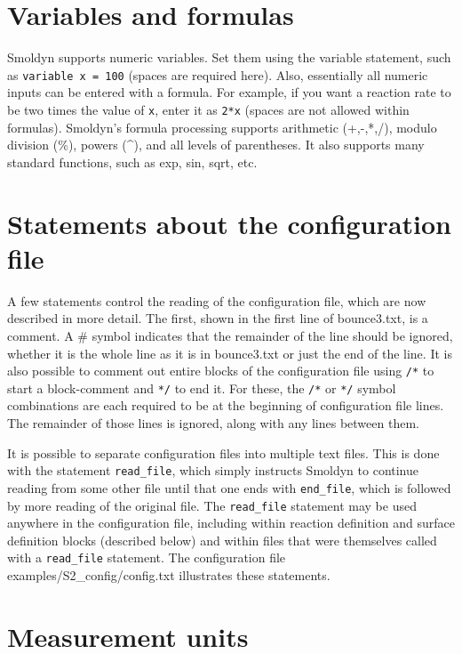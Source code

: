 \documentclass {scrbook}
\newcommand {\ttt} {\texttt}
\begin{document}
\section{Variables and formulas}

Smoldyn supports numeric variables. Set them using the variable statement, such as \ttt{variable x = 100} (spaces are required here). Also, essentially all numeric inputs can be entered with a formula. For example, if you want a reaction rate to be two times the value of \ttt{x}, enter it as \ttt{2*x} (spaces are not allowed within formulas). Smoldyn's formula processing supports arithmetic (+,-,*,/), modulo division (\%), powers (\^{}), and all levels of parentheses. It also supports many standard functions, such as exp, sin, sqrt, etc.

\section{Statements about the configuration file}

A few statements control the reading of the configuration file, which are now described in more detail. The first, shown in the first line of bounce3.txt, is a comment. A \# symbol indicates that the remainder of the line should be ignored, whether it is the whole line as it is in bounce3.txt or just the end of the line. It is also possible to comment out entire blocks of the configuration file using \ttt{/*} to start a block-comment and \ttt{*/} to end it. For these, the \ttt{/*} or \ttt{*/} symbol combinations are each required to be at the beginning of configuration file lines. The remainder of those lines is ignored, along with any lines between them.

It is possible to separate configuration files into multiple text files. This is done with the statement \ttt{read\_file}, which simply instructs Smoldyn to continue reading from some other file until that one ends with \ttt{end\_file}, which is followed by more reading of the original file. The \ttt{read\_file} statement may be used anywhere in the configuration file, including within reaction definition and surface definition blocks (described below) and within files that were themselves called with a \ttt{read\_file} statement. The configuration file examples/S2\_config/config.txt illustrates these statements.

\section{Measurement units}
\label{sect:ConfigUnits}
\end{document}
